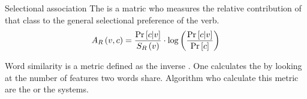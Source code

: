 \begin{df}{Selectional association}
The \sb{} is a matric who measures the relative contribution of that class to the general selectional preference of the verb.
\begin{equation}
A_R\left(v,c\right)=\displaystyle\frac{\Pr\left[c|v\right]}{S_R\left(v\right)}\cdot\log\left(\displaystyle\frac{\Pr\left[c|v\right]}{\Pr\left[c\right]}\right)
\end{equation}
\end{df}
\begin{df}{Word similarity}
\sb{} is a metric defined as the inverse . One calculates the \sb{} by looking at the number of features two words share. Algorithm who calculate this metric are the  or the  systems.
\end{df}
